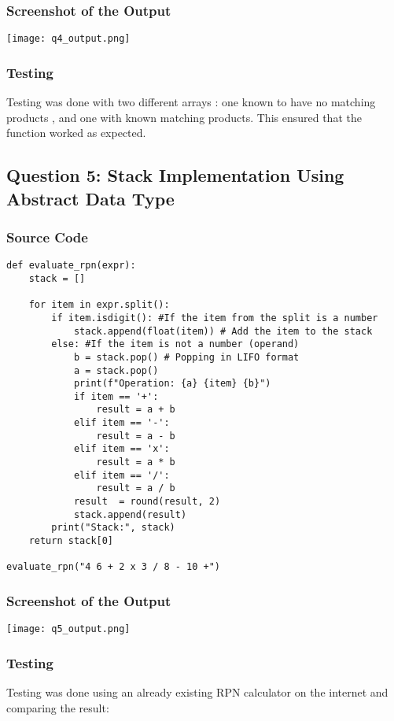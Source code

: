 \documentclass{article}
\begin{document}
\subsubsection*{Screenshot of the Output}
\texttt{[image: q4\_output.png]}

\subsubsection*{Testing}
Testing was done with two different arrays : one known to have no matching products , and one with known matching products. This ensured that the function worked as expected. 

\subsection*{Question 5: Stack Implementation Using Abstract Data Type}
\subsubsection*{Source Code}
\begin{lstlisting}
def evaluate_rpn(expr):
    stack = []

    for item in expr.split():
        if item.isdigit(): #If the item from the split is a number
            stack.append(float(item)) # Add the item to the stack
        else: #If the item is not a number (operand)
            b = stack.pop() # Popping in LIFO format
            a = stack.pop()
            print(f"Operation: {a} {item} {b}")
            if item == '+':
                result = a + b
            elif item == '-':
                result = a - b
            elif item == 'x':
                result = a * b
            elif item == '/':
                result = a / b
            result  = round(result, 2)
            stack.append(result)
        print("Stack:", stack)
    return stack[0]

evaluate_rpn("4 6 + 2 x 3 / 8 - 10 +")
\end{lstlisting}

\subsubsection*{Screenshot of the Output}
\texttt{[image: q5\_output.png]}

\subsubsection*{Testing}
Testing was done using an already existing RPN calculator on the internet and comparing the result:
\end{document}
